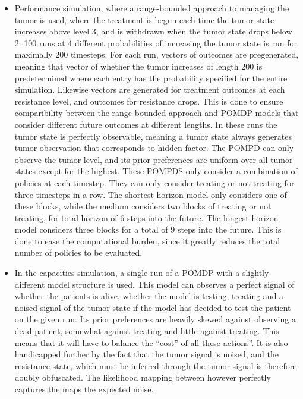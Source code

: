 \documentclass[notspecified,article,submit,moreauthors,pdftex]{Definitions/mdpi}
\begin{document}
\begin{itemize}
\item
  Performance simulation, where a range-bounded approach to managing the
  tumor is used, where the treatment is begun each time the tumor state
  increases above level 3, and is withdrawn when the tumor state drops
  below 2. 100 runs at 4 different probabilities of increasing the tumor
  state is run for maximally 200 timesteps. For each run, vectors of
  outcomes are pregenerated, meaning that vector of whether the tumor
  increases of length 200 is predetermined where each entry has the
  probability specified for the entire simulation. Likewise vectors are
  generated for treatment outcomes at each resistance level, and
  outcomes for resistance drops. This is done to ensure comparibility
  between the range-bounded approach and POMDP models that consider
  different future outcomes at different lengths. In these runs the
  tumor state is perfectly observable, meaning a tumor state always
  generates tumor observation that corresponds to hidden factor. The
  POMPD can only observe the tumor level, and its prior preferences are
  uniform over all tumor states except for the highest. These POMPDS
  only consider a combination of policies at each timestep. They can
  only consider treating or not treating for three timesteps in a row.
  The shortest horizon model only considers one of these blocks, while
  the medium considers two blocks of treating or not treating, for total
  horizon of 6 steps into the future. The longest horizon model
  considers three blocks for a total of 9 steps into the future. This is
  done to ease the computational burden, since it greatly reduces the
  total number of policies to be evaluated.
\item
  In the capacities simulation, a single run of a POMDP with a slightly
  different model structure is used. This model can observes a perfect
  signal of whether the patients is alive, whether the model is testing,
  treating and a noised signal of the tumor state if the model has
  decided to test the patient on the given run. Its prior preferences
  are heavily skewed against observing a dead patient, somewhat against
  treating and little against treating. This means that it will have to
  balance the ``cost'' of all these actions''. It is also handicapped
  further by the fact that the tumor signal is noised, and the
  resistance state, which must be inferred through the tumor signal is
  therefore doubly obfuscated. The likelihood mapping between however
  perfectly captures the maps the expected noise.
\end{itemize}
\end{document}
